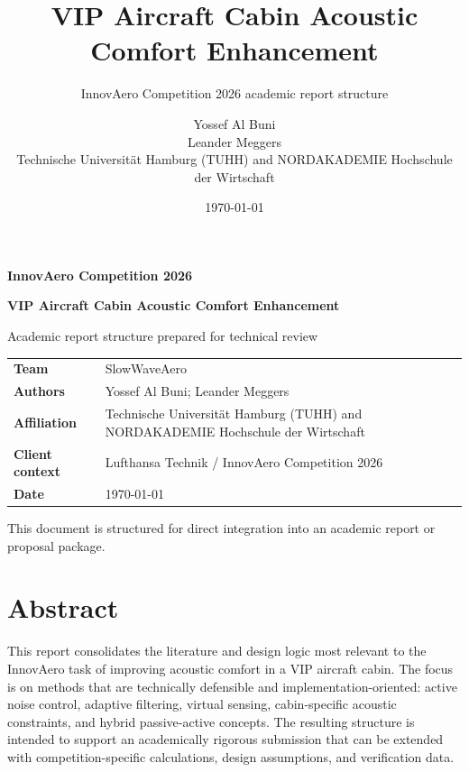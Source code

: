 \documentclass[11pt,a4paper,headings=small]{scrreprt}
\title{VIP Aircraft Cabin Acoustic Comfort Enhancement}
\subtitle{InnovAero Competition 2026 academic report structure}
\author{Yossef Al Buni \\ Leander Meggers \\ Technische Universität Hamburg (TUHH) and NORDAKADEMIE Hochschule der Wirtschaft}
\date{\today}
\begin{document}
\begin{titlepage}
    \centering
    \vspace*{1.5cm}
    {\Large\bfseries InnovAero Competition 2026\par}
    \vspace{1.2cm}
    {\huge\bfseries VIP Aircraft Cabin Acoustic Comfort Enhancement\par}
    \vspace{0.8cm}
    {\Large Academic report structure prepared for technical review\par}
    \vspace{1.8cm}
    \begin{tabular}{>{\bfseries}p{4cm}p{8.5cm}}
        Team & SlowWaveAero \\
        Authors & Yossef Al Buni; Leander Meggers \\
        Affiliation & Technische Universität Hamburg (TUHH) and NORDAKADEMIE Hochschule der Wirtschaft \\
        Client context & Lufthansa Technik / InnovAero Competition 2026 \\
        Date & \today \\
    \end{tabular}
    \vfill
    {\small This document is structured for direct integration into an academic report or proposal package.\par}
\end{titlepage}

\chapter*{Abstract}
This report consolidates the literature and design logic most relevant to the InnovAero task of improving acoustic comfort in a VIP aircraft cabin. The focus is on methods that are technically defensible and implementation-oriented: active noise control, adaptive filtering, virtual sensing, cabin-specific acoustic constraints, and hybrid passive-active concepts. The resulting structure is intended to support an academically rigorous submission that can be extended with competition-specific calculations, design assumptions, and verification data.

\tableofcontents
\clearpage
\listoftables
\clearpage










\end{document}
